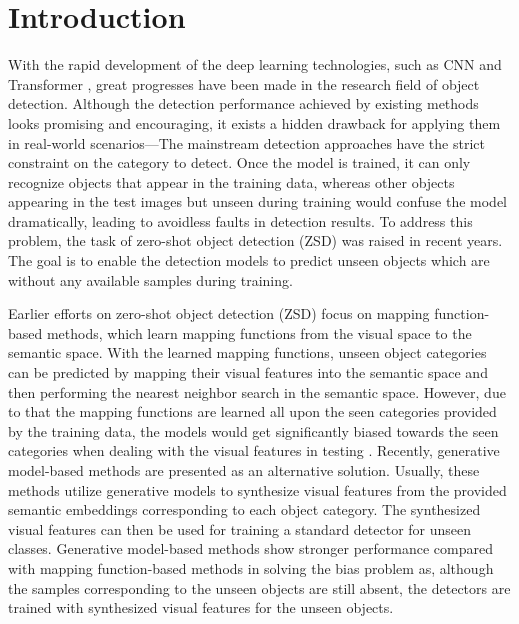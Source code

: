 \documentclass[10pt,twocolumn,letterpaper]{article}
\begin{document}
\section{Introduction}
\label{sec:intro}
With the rapid development of the deep learning technologies, such as CNN \cite{ren2016faster,han2018advanced} and Transformer \cite{liu2021swin}, great progresses have been made in the research field of object detection. Although the detection performance achieved by existing methods looks promising and encouraging, it exists a hidden drawback for applying them in real-world scenarios---The mainstream detection approaches have the strict constraint on the category to detect. Once the model is trained, it can only recognize objects that appear in the training data, whereas other objects appearing in the test images but unseen during training would confuse the model dramatically, leading to avoidless faults in detection results. To address this problem, the task of zero-shot object detection (ZSD)\cite{bansal2018zero, rahman2018zero, zhu2020don, hayat2020synthesizing} was raised in recent years. The goal is to enable the detection models to predict unseen objects which are without any available samples during training.

Earlier efforts on zero-shot object detection (ZSD) \cite{bansal2018zero, rahman2018zero} focus on mapping function-based methods, which learn mapping functions from the visual space to the semantic space. With the learned mapping functions, unseen object categories can be predicted by mapping their visual features into the semantic space and then performing the nearest neighbor search in the semantic space. However, due to that the mapping functions are learned all upon the seen categories provided by the training data, the models would get significantly biased towards the seen categories when dealing with the visual features in testing \cite{hayat2020synthesizing}. Recently, generative model-based methods \cite{zhu2020don, hayat2020synthesizing} are presented as an alternative solution. Usually, these methods utilize generative models to synthesize visual features from the provided semantic embeddings \cite{mikolov2013distributed, akata2015evaluation} corresponding to each object category. The synthesized visual features can then be used for training a standard detector for unseen classes. Generative model-based methods show stronger performance compared with mapping function-based methods in solving the bias problem as, although the samples corresponding to the unseen objects are still absent, the detectors are trained with synthesized visual features for the unseen objects.
\end{document}
